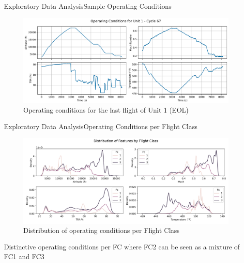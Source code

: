\documentclass{beamer}
\begin{document}
        \begin{frame}{Exploratory Data Analysis}{Sample Operating Conditions}
            \begin{figure}[!htbp]
                \centering
                \includegraphics[scale=0.35]{operating_conditions_unit_1_cycle_67.png}
                \caption{Operating conditions for the last flight of Unit 1 (EOL)}
            \end{figure}
        \end{frame}

        \begin{frame}{Exploratory Data Analysis}{Operating Conditions per Flight Class}
            \begin{figure}[!htbp]
                \centering
                \includegraphics[scale=0.35]{features_per_condition_fc.png}
                \caption{Distribution of operating conditions per Flight Class}
            \end{figure}

            Distinctive operating conditions per FC where FC2 can be seen as a mixture of FC1 and FC3
        \end{frame}
\end{document}
